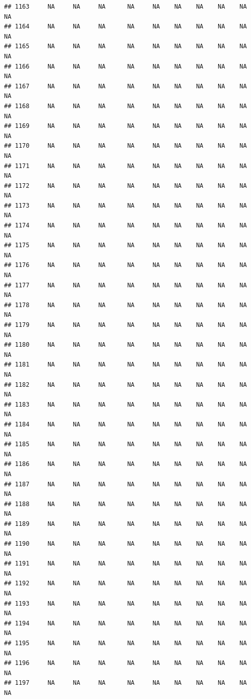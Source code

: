 \documentclass{article}\usepackage{graphicx, color}
\makeatletter
\newenvironment{kframe}{%
 \def\at@end@of@kframe{}%
 \ifinner\ifhmode%
  \def\at@end@of@kframe{\end{minipage}}%
  \begin{minipage}{\columnwidth}%
 \fi\fi%
 \def\FrameCommand##1{\hskip\@totalleftmargin \hskip-\fboxsep
 \colorbox{shadecolor}{##1}\hskip-\fboxsep
     \hskip-\linewidth \hskip-\@totalleftmargin \hskip\columnwidth}%
 \MakeFramed {\advance\hsize-\width
   \@totalleftmargin\z@ \linewidth\hsize
   \@setminipage}}%
 {\par\unskip\endMakeFramed%
 \at@end@of@kframe}
\newenvironment{knitrout}{}{} %
\makeatother
\begin{document}
\begin{knitrout}
\begin{kframe}
\begin{verbatim}
## 1163     NA     NA     NA      NA     NA    NA    NA    NA    NA     NA
## 1164     NA     NA     NA      NA     NA    NA    NA    NA    NA     NA
## 1165     NA     NA     NA      NA     NA    NA    NA    NA    NA     NA
## 1166     NA     NA     NA      NA     NA    NA    NA    NA    NA     NA
## 1167     NA     NA     NA      NA     NA    NA    NA    NA    NA     NA
## 1168     NA     NA     NA      NA     NA    NA    NA    NA    NA     NA
## 1169     NA     NA     NA      NA     NA    NA    NA    NA    NA     NA
## 1170     NA     NA     NA      NA     NA    NA    NA    NA    NA     NA
## 1171     NA     NA     NA      NA     NA    NA    NA    NA    NA     NA
## 1172     NA     NA     NA      NA     NA    NA    NA    NA    NA     NA
## 1173     NA     NA     NA      NA     NA    NA    NA    NA    NA     NA
## 1174     NA     NA     NA      NA     NA    NA    NA    NA    NA     NA
## 1175     NA     NA     NA      NA     NA    NA    NA    NA    NA     NA
## 1176     NA     NA     NA      NA     NA    NA    NA    NA    NA     NA
## 1177     NA     NA     NA      NA     NA    NA    NA    NA    NA     NA
## 1178     NA     NA     NA      NA     NA    NA    NA    NA    NA     NA
## 1179     NA     NA     NA      NA     NA    NA    NA    NA    NA     NA
## 1180     NA     NA     NA      NA     NA    NA    NA    NA    NA     NA
## 1181     NA     NA     NA      NA     NA    NA    NA    NA    NA     NA
## 1182     NA     NA     NA      NA     NA    NA    NA    NA    NA     NA
## 1183     NA     NA     NA      NA     NA    NA    NA    NA    NA     NA
## 1184     NA     NA     NA      NA     NA    NA    NA    NA    NA     NA
## 1185     NA     NA     NA      NA     NA    NA    NA    NA    NA     NA
## 1186     NA     NA     NA      NA     NA    NA    NA    NA    NA     NA
## 1187     NA     NA     NA      NA     NA    NA    NA    NA    NA     NA
## 1188     NA     NA     NA      NA     NA    NA    NA    NA    NA     NA
## 1189     NA     NA     NA      NA     NA    NA    NA    NA    NA     NA
## 1190     NA     NA     NA      NA     NA    NA    NA    NA    NA     NA
## 1191     NA     NA     NA      NA     NA    NA    NA    NA    NA     NA
## 1192     NA     NA     NA      NA     NA    NA    NA    NA    NA     NA
## 1193     NA     NA     NA      NA     NA    NA    NA    NA    NA     NA
## 1194     NA     NA     NA      NA     NA    NA    NA    NA    NA     NA
## 1195     NA     NA     NA      NA     NA    NA    NA    NA    NA     NA
## 1196     NA     NA     NA      NA     NA    NA    NA    NA    NA     NA
## 1197     NA     NA     NA      NA     NA    NA    NA    NA    NA     NA

\end{verbatim}
\end{kframe}
\end{knitrout}
\end{document}
